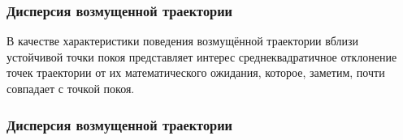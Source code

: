\documentclass[slidestop,compress,mathserif]{beamer}
\begin{document}
\begin{frame}
\frametitle{Дисперсия возмущенной траектории}
\vspace{4em}
В качестве характеристики поведения возмущённой траектории вблизи устойчивой точки покоя представляет интерес среднеквадратичное отклонение точек траектории от их математического ожидания, которое, заметим, почти совпадает с точкой покоя.
\end{frame}
\begin{frame}
\frametitle{Дисперсия возмущенной траектории}
\begin{figure}[h!]
\vspace{-1em}
\vspace{-2em}
\end{figure}
\end{frame}
\end{document}
